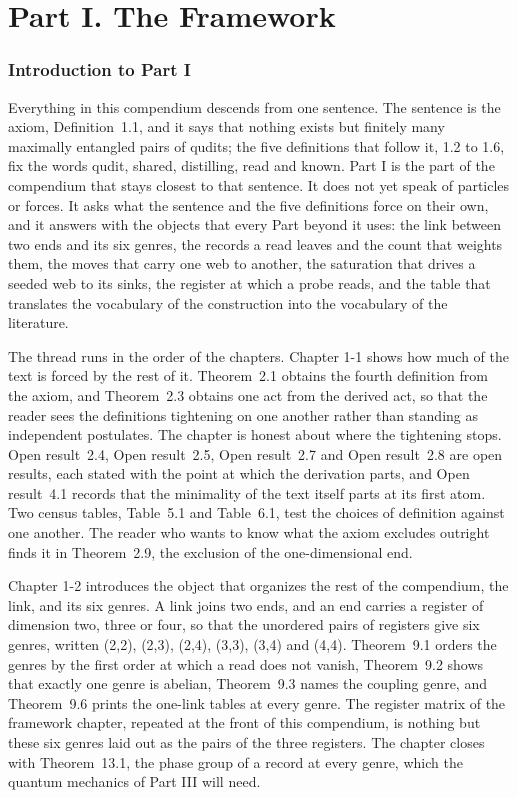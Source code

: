 \clearpage
\part*{Part I. The Framework}
\label{atlaspart:01-framework}
\section*{Introduction to Part I}\label{narr:part:I}
Everything in this compendium descends from one sentence. The sentence is the axiom, Definition~1.1, and it says that nothing exists but finitely many maximally entangled pairs of qudits; the five definitions that follow it, 1.2 to 1.6, fix the words qudit, shared, distilling, read and known. Part I is the part of the compendium that stays closest to that sentence. It does not yet speak of particles or forces. It asks what the sentence and the five definitions force on their own, and it answers with the objects that every Part beyond it uses: the link between two ends and its six genres, the records a read leaves and the count that weights them, the moves that carry one web to another, the saturation that drives a seeded web to its sinks, the register at which a probe reads, and the table that translates the vocabulary of the construction into the vocabulary of the literature.

The thread runs in the order of the chapters. Chapter 1-1 shows how much of the text is forced by the rest of it. Theorem~2.1 obtains the fourth definition from the axiom, and Theorem~2.3 obtains one act from the derived act, so that the reader sees the definitions tightening on one another rather than standing as independent postulates. The chapter is honest about where the tightening stops. Open result~2.4, Open result~2.5, Open result~2.7 and Open result~2.8 are open results, each stated with the point at which the derivation parts, and Open result~4.1 records that the minimality of the text itself parts at its first atom. Two census tables, Table~5.1 and Table~6.1, test the choices of definition against one another. The reader who wants to know what the axiom excludes outright finds it in Theorem~2.9, the exclusion of the one-dimensional end.

Chapter 1-2 introduces the object that organizes the rest of the compendium, the link, and its six genres. A link joins two ends, and an end carries a register of dimension two, three or four, so that the unordered pairs of registers give six genres, written (2,2), (2,3), (2,4), (3,3), (3,4) and (4,4). Theorem~9.1 orders the genres by the first order at which a read does not vanish, Theorem~9.2 shows that exactly one genre is abelian, Theorem~9.3 names the coupling genre, and Theorem~9.6 prints the one-link tables at every genre. The register matrix of the framework chapter, repeated at the front of this compendium, is nothing but these six genres laid out as the pairs of the three registers. The chapter closes with Theorem~13.1, the phase group of a record at every genre, which the quantum mechanics of Part III will need.

